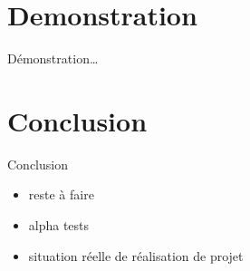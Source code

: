 \documentclass{beamer}
\begin{document}
\section{Demonstration}
\begin{frame}
\begin{center}
\huge{Démonstration\dots{}}
\end{center}
\end{frame}

\section{Conclusion}
\begin{frame}
Conclusion
\begin{itemize}
  \item reste à faire
  \item alpha tests
  \item situation réelle de réalisation de projet
  \end{itemize}
\end{frame}

\end{document}
